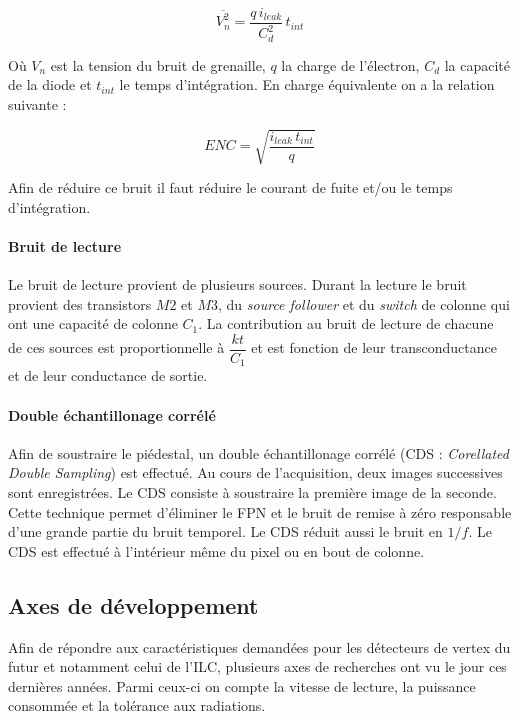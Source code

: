    \begin{equation}
    \overline{V_n^2} = \dfrac{ q \, i_{leak} }{C_d^2} \, t_{int}
   \end{equation}
   
   O\`u $V_n$ est la tension du bruit de grenaille, $q$ la charge de l'\'electron, $C_d$ la capacit\'e de la diode et $t_{int}$ le temps d'int\'egration. En charge \'equivalente on a la relation suivante : 
   
   \begin{equation}
    ENC = \sqrt{ \dfrac{ i_{leak} \, t_{int} }{q} }
   \end{equation}

   Afin de r\'eduire ce bruit il faut réduire le courant de fuite et/ou le temps d'int\'egration.
   
   \paragraph{Bruit de lecture}
   
   Le bruit de lecture provient de plusieurs sources. Durant la lecture le bruit provient des transistors $M2$ et $M3$, du \textit{source follower} et du \textit{switch} de colonne qui ont une capacit\'e de colonne $C_1$. La contribution au bruit de lecture de chacune de ces sources est proportionnelle \`a $\dfrac{kt}{C_1}$ et est fonction de leur transconductance et de leur conductance de sortie.
   
   \paragraph{Double \'echantillonage corr\'el\'e}
   \label{sect:CDS_Noise}
   
   Afin de soustraire le pi\'edestal, un double \'echantillonage corr\'el\'e (CDS : \textit{Corellated Double Sampling}) est effectu\'e. Au cours de l'acquisition, deux images successives sont enregistr\'ees. Le CDS consiste \`a soustraire la premi\`ere image de la seconde. Cette technique permet d'\'eliminer le FPN et le bruit de remise \`a zéro responsable d'une grande partie du bruit temporel. Le CDS r\'eduit aussi le bruit en $1/f$. Le CDS est effectu\'e \`a l'intérieur m\^eme du pixel ou en bout de colonne.
   
  \subsection{Axes de d\'eveloppement}
   
   Afin de r\'epondre aux caract\'eristiques demand\'ees pour les d\'etecteurs de vertex du futur et notamment celui de l'ILC, plusieurs axes de recherches ont vu le jour ces derni\`eres ann\'ees. Parmi ceux-ci on compte la vitesse de lecture, la puissance consomm\'ee et la tol\'erance aux radiations.
   
